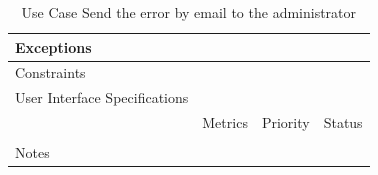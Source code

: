 \begin{table}[H]
\begin{tabularx}{\linewidth}{|l|X|X|X|}
            \hline Exceptions                    & \multicolumn{3}{l|}{}                                                                                 \\

            \hline Constraints                   & \multicolumn{3}{l|}{}                                                                                 \\

            \hline User Interface Specifications & \multicolumn{3}{l|}{}                                                                                 \\

            \hline \multirow{2}{*}{}             & Metrics                                                                           & Priority & Status \\
            \cline{2-4}                          &                                                                                   &          &        \\
            \hline Notes                         & \multicolumn{3}{l|}{}                                                                                 \\
            \hline
      \end{tabularx}
      \caption{Use Case Send the error by email to the administrator}
      \label{tab:use_case_send_error_by_email_to_the_administrator}
\end{table}

